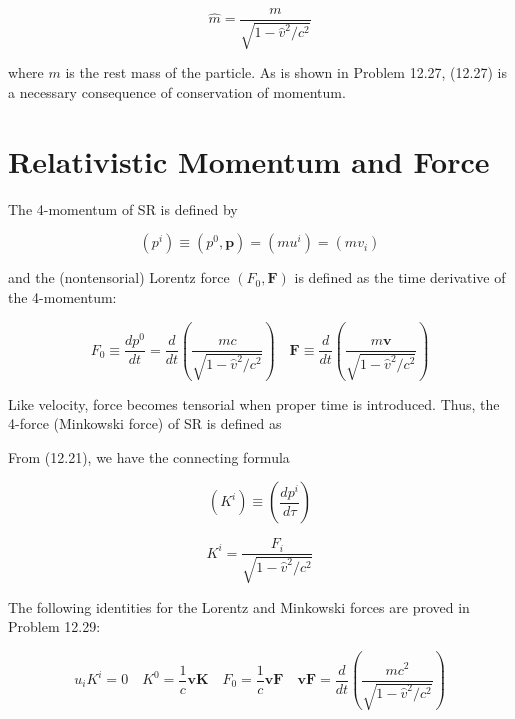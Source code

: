 \documentclass[10pt]{article}
\begin{document}
\begin{equation*}
\hat{m}=\frac{m}{\sqrt{1-\hat{v}^{2} / c^{2}}} \tag{12.27}
\end{equation*}


where $m$ is the rest mass of the particle. As is shown in Problem 12.27, (12.27) is a necessary consequence of conservation of momentum.

\section*{Relativistic Momentum and Force}
The 4-momentum of SR is defined by


\begin{equation*}
\left(p^{i}\right) \equiv\left(p^{0}, \mathbf{p}\right)=\left(m u^{i}\right)=\left(\hat{m} v_{i}\right) \tag{12.28}
\end{equation*}


and the (nontensorial) Lorentz force $\left(F_{0}, \mathbf{F}\right)$ is defined as the time derivative of the 4-momentum:


\begin{equation*}
F_{0} \equiv \frac{d p^{0}}{d t}=\frac{d}{d t}\left(\frac{m c}{\sqrt{1-\hat{v}^{2} / c^{2}}}\right) \quad \mathbf{F} \equiv \frac{d}{d t}\left(\frac{m \mathbf{v}}{\sqrt{1-\hat{v}^{2} / c^{2}}}\right) \tag{12.29}
\end{equation*}


Like velocity, force becomes tensorial when proper time is introduced. Thus, the 4-force (Minkowski force) of SR is defined as

From (12.21), we have the connecting formula


\begin{equation*}
\left(K^{i}\right) \equiv\left(\frac{d p^{i}}{d \tau}\right) \tag{12.30}
\end{equation*}



\begin{equation*}
K^{i}=\frac{F_{i}}{\sqrt{1-\hat{v}^{2} / c^{2}}} \tag{12.31}
\end{equation*}


The following identities for the Lorentz and Minkowski forces are proved in Problem 12.29:


\begin{equation*}
u_{i} K^{i}=0 \quad K^{0}=\frac{1}{c} \mathbf{v K} \quad F_{0}=\frac{1}{c} \mathbf{v F} \quad \mathbf{v F}=\frac{d}{d t}\left(\frac{m c^{2}}{\sqrt{1-\hat{v}^{2} / c^{2}}}\right) \tag{12.32}
\end{equation*}
\end{document}
